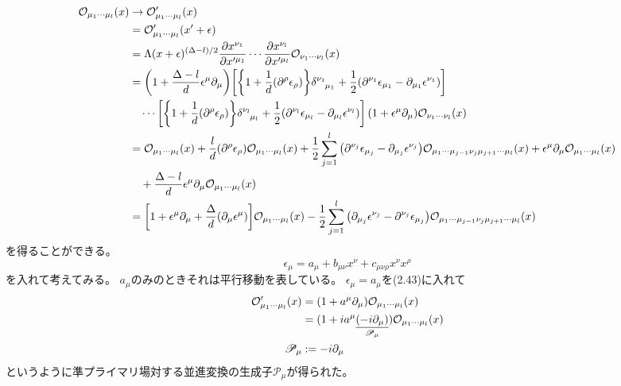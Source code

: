 \documentclass[../../master.tex]{subfiles}
\begin{document}
\begin{align}
    \mathcal{O}_{\mu_1\cdots\mu_l}(x)
    &\rightarrow \mathcal{O}'_{\mu_1\cdots\mu_l}(x) \notag\\
    &= \mathcal{O}'_{\mu_1\cdots\mu_l}(x'+\epsilon) \notag\\
    &= \Lambda(x+\epsilon)^{(\Delta-l)/2}\pdv{x^{\nu_1}}{x'^{\mu_1}}\cdots\pdv{x^{\nu_l}}{x'^{\mu_l}} (1+\epsilon^\mu\partial_\mu)\mathcal{O}_{\nu_1\cdots\nu_l}(x) \notag\\
    &= \qty(1+\frac{\Delta-l}{d}\epsilon^\mu\partial_\mu)
        \qty[\qty{1+\frac{1}{d}(\partial^\rho \epsilon_\rho)}\tensor{\delta}{^{\nu_1}_{\mu_1}} + \frac{1}{2}\qty(\partial^{\nu_1} \epsilon_{\mu_1}
        -\partial_{\mu_1} \epsilon^{\nu_1})]\notag\\
        &\quad \cdots
        \qty[\qty{1+\frac{1}{d}(\partial^\rho \epsilon_\rho)}\tensor{\delta}{^{\nu_l}_{\mu_l}} + \frac{1}{2}\qty(\partial^{\nu_l} \epsilon_{\mu_l}
        -\partial_{\mu_l} \epsilon^{\nu_l})]
        (1+\epsilon^\mu\partial_\mu)\mathcal{O}_{\nu_1\cdots\nu_l}(x) \notag\\
    &= \mathcal{O}_{\mu_1\cdots\mu_l}(x) + \frac{l}{d}(\partial^\rho \epsilon_\rho)\mathcal{O}_{\mu_1\cdots\mu_l}(x)
        +\frac{1}{2}\sum_{j=1}^l \qty(\partial^{\nu_j} \epsilon_{\mu_j}-\partial_{\mu_j} \epsilon^{\nu_j})\mathcal{O}_{\mu_1\cdots\mu_{j-1}\nu_j\mu_{j+1}\cdots\mu_l}(x)
        + \epsilon^\mu\partial_\mu\mathcal{O}_{\mu_1\cdots\mu_l}(x) \notag\\
        &\quad + \frac{\Delta-l}{d} \epsilon^\mu \partial_\mu \mathcal{O}_{\mu_1\cdots\mu_l}(x)\notag\\
    &= \qty[1+\epsilon^\mu\partial_\mu +\frac{\Delta}{d}(\partial_\mu\epsilon^\mu)]\mathcal{O}_{\mu_1\cdots\mu_l}(x)
        -\frac{1}{2}\sum_{j=1}^l \qty(\partial_{\mu_j} \epsilon^{\nu_j}-\partial^{\nu_j} \epsilon_{\mu_j})\mathcal{O}_{\mu_1\cdots\mu_{j-1}\nu_j\mu_{j+1}\cdots\mu_l}(x)
\end{align}
を得ることができる。
\begin{equation*}
    \epsilon_\mu = a_\mu + b_{\mu\nu}x^\nu + c_{\mu\nu\rho}x^\nu x^\rho \tag{2.10}
\end{equation*}
を入れて考えてみる。
\(a_\mu\)のみのときそれは平行移動を表している。
\(\epsilon_\mu = a_\mu\)を(2.43)に入れて
\begin{align}
    \mathcal{O}'_{\mu_1\cdots\mu_l}(x)
    &= (1 + a^\mu \partial_\mu)\mathcal{O}_{\mu_1\cdots\mu_l}(x)\notag\\
    &= (1 +i a^\mu \underset{\mathscr{P}_\mu}{\underline{(-i\partial_\mu)}})\mathcal{O}_{\mu_1\cdots\mu_l}(x) \notag\\
    \mathscr{P}_\mu &:= -i\partial_\mu
\end{align}
というように準プライマリ場対する並進変換の生成子\(\mathscr{P}_\mu\)が得られた。
\end{document}
